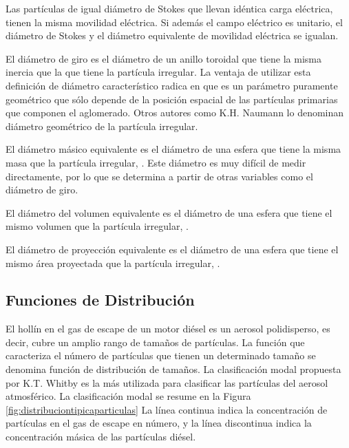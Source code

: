 \par Las partículas de igual diámetro de Stokes que llevan idéntica carga eléctrica, tienen la misma movilidad eléctrica. Si además el campo eléctrico es unitario, el diámetro de Stokes y el diámetro equivalente de movilidad eléctrica se igualan.

\par El diámetro de giro es el diámetro de un anillo toroidal que tiene la misma inercia que la que tiene la partícula irregular. La ventaja de utilizar esta definición de diámetro característico radica en que es un parámetro puramente geométrico que sólo depende de la posición espacial de las partículas primarias que componen el aglomerado. Otros autores como K.H. Naumann \cite{naumann:2003} lo denominan diámetro geométrico de la partícula irregular.

\par El diámetro másico equivalente es el diámetro de una esfera que tiene la misma masa que la partícula irregular, \cite{naumann:2003}. Este diámetro es muy difícil de medir directamente, por lo que se determina a partir de otras variables como el diámetro de giro.

\par El diámetro del volumen equivalente es el diámetro de una esfera que tiene el mismo volumen que la partícula irregular, \cite{parketal:2003}.

\par El diámetro de proyección equivalente es el diámetro de una esfera que tiene el mismo área proyectada que la partícula irregular, \cite{whitby:1978}. 

\subsection{Funciones de Distribución}\label{subsec:funcionesdistribucion}

\par El hollín en el gas de escape de un motor diésel es un aerosol polidisperso, es decir, cubre un amplio rango de tamaños de partículas. La función que caracteriza el número de partículas que tienen un determinado tamaño se denomina función de distribución de tamaños. 
La clasificación modal propuesta por K.T. Whitby \cite{whitby:1978} es la más utilizada para clasificar las partículas del aerosol atmosférico. La clasificación modal se resume en la Figura \ref{fig:distribuciontipicaparticulas} La línea continua indica la concentración de partículas en el gas de escape en número, y la línea discontinua indica la concentración másica de las partículas diésel.

